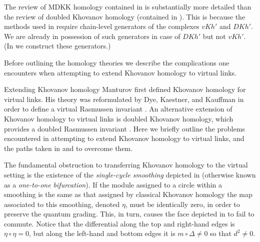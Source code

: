 \documentclass[10pt,oneside]{amsart}
\theoremstyle{definition}
\numberwithin{equation}{section}
\begin{document}
The review of MDKK homology contained in  is substantially more detailed than the review of doubled Khovanov homology (contained in ). This is because the methods used in  require chain-level generators of the complexes \( {vKh} ' \) and \( {DKh} ' \). We are already in possession of such generators in case of \( {DKh} ' \) but not \( {vKh} ' \). (In  we construct these generators.)

Before outlining the homology theories we describe the complications one encounters when attempting to extend Khovanov homology to virtual links.

{		{\normalfont\bfseries\large}}{Extending Khovanov homology}\label{Subsec:extending}
Manturov \cite{Manturov2006} first defined Khovanov homology for virtual links. His theory was reformulated by Dye, Kaestner, and Kauffman in order to define a virtual Rasmussen invariant \cite{Dye2014}. An alternative extension of Khovanov homology to virtual links is doubled Khovanov homology, which provides a doubled Rasmussen invariant \cite{Rushworth2017}. Here we briefly outline the problems encountered in attempting to extend Khovanov homology to virtual links, and the paths taken in \cite{Dye2014} and \cite{Rushworth2017} to overcome them.

The fundamental obstruction to transferring Khovanov homology to the virtual setting is the existence of the \textit{single-cycle smoothing} depicted in  (otherwise known as a \textit{one-to-one bifurcation}). If the module assigned to a circle within a smoothing is the same as that assigned by classical Khovanov homology the map associated to this smoothing, denoted \( \eta \), must be identically zero, in order to preserve the quantum grading. This, in turn, causes the face depicted in  to fail to commute. Notice that the differential along the top and right-hand edges is \( \eta \circ \eta = 0 \), but along the left-hand and bottom edges it is \( m \circ \Delta \neq 0 \) so that \( d^2 \neq 0 \).
\end{document}
